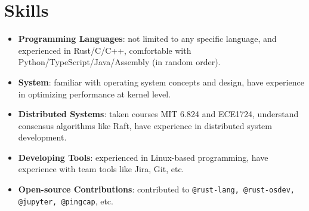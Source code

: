 \documentclass{resume}
\newcommand{\en}[1]{#1}
\newcommand{\zh}[1]{}
\begin{document}
\section{\en{Skills}\zh{技能}}
\begin{itemize}[parsep=0.25ex]
      \item \en{\textbf{Programming Languages}:
                  not limited to any specific language,
                  and experienced in Rust/C/C++,
                  comfortable with Python/TypeScript/Java/Assembly (in random order).}
            \zh{\textbf{编程语言}:
                  不局限于特定编程语言，且尤其熟悉 Rust/C/C++ 等，
                  了解 Python/TypeScript/Java/Assembly 等（不分先后）。}

      \item \en{\textbf{System}:
                  familiar with operating system concepts and design,
                  have experience in optimizing performance at kernel level.}
            \zh{\textbf{系统}:
                  熟悉各种操作系统内核的概念与设计。}

      \item \en{\textbf{Distributed Systems}:
                  taken courses MIT 6.824 and ECE1724,
                  understand consensus algorithms like Raft,
                  have experience in distributed system development.}
            \zh{\textbf{分布式系统}:
                  熟悉 Raft 等算法，有分布式系统开发经验。}

      \item \en{\textbf{Developing Tools}:
                  experienced in Linux-based programming,
                  have experience with team tools like Jira, Git, etc.}
            \zh{\textbf{开发工具}:
                  十分熟悉 Linux，有 Jira、Git 等团队合作工具的经验。}
      \item \en{\textbf{Open-source Contributions}:
                  contributed to \texttt{@rust-lang, @rust-osdev, @jupyter, @pingcap}, etc.}
            \zh{\textbf{开源贡献}:
                  为 \texttt{@rust-lang, @rust-osdev, @jupyter, @pingcap} 等组织贡献过代码。}
\end{itemize}
\end{document}
